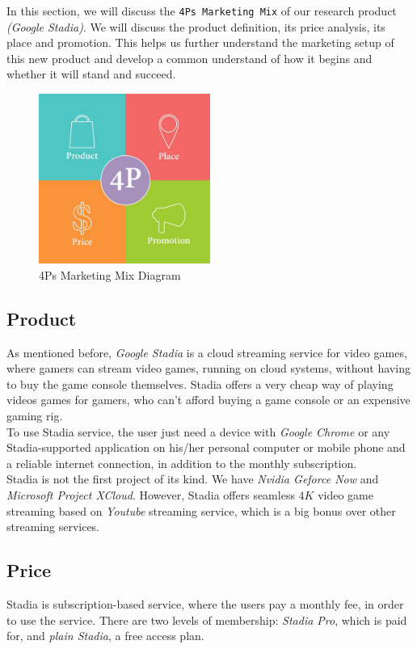 In this section, we will discuss the \texttt{4Ps Marketing Mix} of our research product \emph{(Google Stadia)}. We will discuss the product definition, its price analysis, its place and promotion. This helps us further understand the marketing setup of this new product and develop a common understand of how it begins and whether it will stand and succeed.

\begin{figure}[h]
    \centering
    \includegraphics[width=0.5\textwidth]{images/4p.jpg}
    \caption{4Ps Marketing Mix Diagram}
    \label{fig:4p}
\end{figure}

\subsection{Product}
As mentioned before, \emph{Google Stadia} is a cloud streaming service for video games, where gamers can stream video games, running on cloud systems, without having to buy the game console themselves. Stadia offers a very cheap way of playing videos games for gamers, who can't afford buying a game console or an expensive gaming rig. \\

To use Stadia service, the user just need a device with \emph{Google Chrome} or any Stadia-supported application on his/her personal computer or mobile phone and a reliable internet connection, in addition to the monthly subscription. \\

Stadia is not the first project of its kind. We have \emph{Nvidia Geforce Now} and \emph{Microsoft Project XCloud}. However, Stadia offers seamless $4K$ video game streaming based on \emph{Youtube} streaming service, which is a big bonus over other streaming services. 

\subsection{Price}
Stadia is subscription-based service, where the users pay a monthly fee, in order to use the service. There are two levels of membership: \emph{Stadia Pro}, which is paid for, and \emph{plain Stadia}, a free access plan. \\


